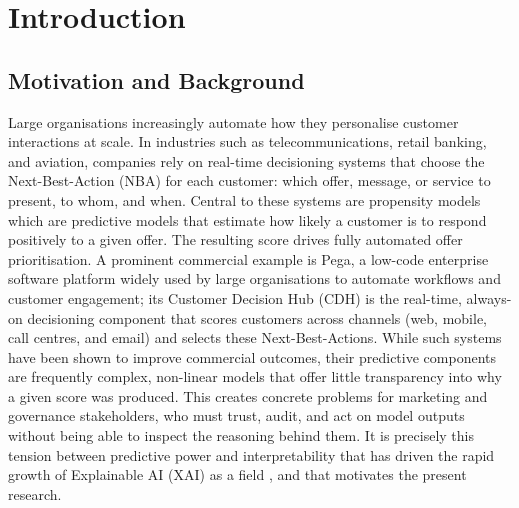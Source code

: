 \documentclass[oneside]{memoir} %
\begin{document}
\newpage
\tableofcontents
\newpage


\linespread{2}

\chapter{Introduction}	%

\section{Motivation and Background}

Large organisations increasingly automate how they personalise customer interactions at scale. In industries such as telecommunications, retail banking, and aviation, companies rely on real-time decisioning systems that choose the Next-Best-Action (NBA) for each customer: which offer, message, or service to present, to whom, and when. Central to these systems are propensity models which are predictive models that estimate how likely a customer is to respond positively to a given offer. The resulting score drives fully automated offer prioritisation\parencite{pega_prioritizing_2025}. A prominent commercial example is Pega, a low-code enterprise software platform widely used by large organisations to automate workflows and customer engagement; its Customer Decision Hub (CDH) is the real-time, always-on decisioning component that scores customers across channels (web, mobile, call centres, and email) and selects these Next-Best-Actions. While such systems have been shown to improve commercial outcomes, their predictive components are frequently complex, non-linear models that offer little transparency into why a given score was produced. This creates concrete problems for marketing and governance stakeholders, who must trust, audit, and act on model outputs without being able to inspect the reasoning behind them. It is precisely this tension between predictive power and interpretability that has driven the rapid growth of Explainable AI (XAI) as a field \parencite{vilone_explainable_2020}, and that motivates the present research.
\end{document}
